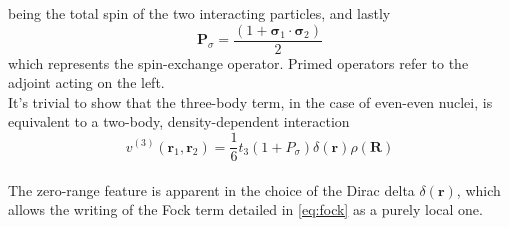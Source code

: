 being the total spin of the two interacting particles, and lastly
\begin{equation}
    \mathbf{P}_\sigma = \frac{(1+\boldsymbol{\sigma}_1\cdot\boldsymbol{\sigma}_2)}{2}
\end{equation}
which represents the spin-exchange operator.
Primed operators refer to the adjoint acting on the left.
\\It's trivial to show that the three-body term, in the case of even-even nuclei, is equivalent to a two-body, density-dependent interaction \cite{VauhBrinkOriginal}
\begin{equation}
v^{(3)}(\bm r_1, \bm r_2) = \frac 1 6 t_3 (1+P_\sigma)  \delta(\bm r )\rho(\bm R)
\end{equation}
\\The zero-range feature is apparent in the choice of the Dirac delta $\delta(\mathbf r)$, which allows the writing of the Fock term detailed in \eqref{eq:fock} as a purely local one.
